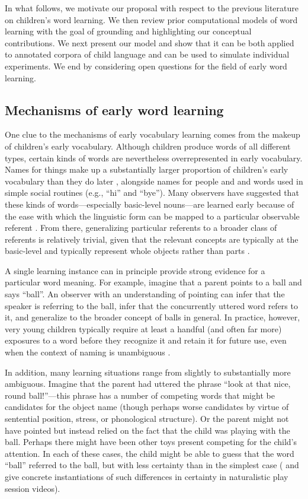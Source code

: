 \documentclass[man,noapacite,12pt]{apa2}
\begin{document}
In what follows, we motivate our proposal with respect to the previous literature on children's word learning. We then review prior computational models of word learning with the goal of grounding and highlighting our conceptual contributions. We next present our model and show that it can be both applied to annotated corpora of child language and can be used to simulate individual experiments. We end by considering open questions for the field of early word learning.

\subsection{Mechanisms of early word learning}

One clue to the mechanisms of early vocabulary learning comes from the makeup of children's early vocabulary. Although children produce words of all different types, certain kinds of words are nevertheless overrepresented in early vocabulary. Names for things make up a substantially larger proportion of children's early vocabulary than they do later \cite{tardif2008,caselli1995}, alongside names for people and and words used in simple social routines (e.g., ``hi'' and ``bye''). Many observers have suggested that these kinds of words---especially basic-level nouns---are learned early because of the ease with which the linguistic form can be mapped to a particular observable referent \cite{locke1700,bloom2002,clark2003}. From there, generalizing particular referents to a broader class of referents is relatively trivial, given that the relevant concepts are typically at the basic-level and typically represent whole objects rather than parts \cite{markman1991}.

A single learning instance can in principle provide strong evidence for a particular word meaning. For example, imagine that a parent points to a ball and says ``ball''. An observer with an understanding of pointing can infer that the speaker is referring to the ball, infer that the concurrently uttered word refers to it, and generalize to the broader concept of balls in general. In practice, however, very young children typically require at least a handful (and often far more) exposures to a word before they recognize it and retain it for future use, even when the context of naming is unambiguous \cite{woodward1994}.

In addition, many learning situations range from slightly to substantially more ambiguous. Imagine that the parent had uttered the phrase ``look at that nice, round ball!''---this phrase has a number of competing words that might be candidates for the object name (though perhaps worse candidates by virtue of sentential position, stress, or phonological structure). Or the parent might not have pointed but instead relied on the fact that the child was playing with the ball. Perhaps there might have been other toys present competing for the child's attention. In each of these cases, the child might be able to guess that the word ``ball'' referred to the ball, but with less certainty than in the simplest case ( and  give concrete instantiations of such differences in certainty in naturalistic play session videos). 
\end{document}
